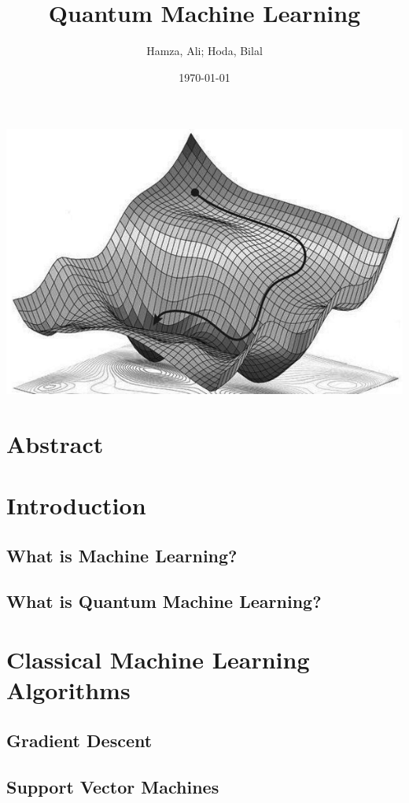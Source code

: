 \documentclass{article}
\title{Quantum Machine Learning}
\author{Hamza, Ali; Hoda, Bilal}
\date{\today}
\begin{document}
\maketitle

\begin{center}
    \includegraphics[scale = 0.7]{images/title2.jpg}
\end{center}

\newpage

\tableofcontents
\newpage

\section{Abstract}
\section{Introduction}
\subsection{What is Machine Learning?}
\subsection{What is Quantum Machine Learning?}

\newpage
\section{Classical Machine Learning Algorithms}
\subsection{Gradient Descent}
\subsection{Support Vector Machines}
\end{document}
